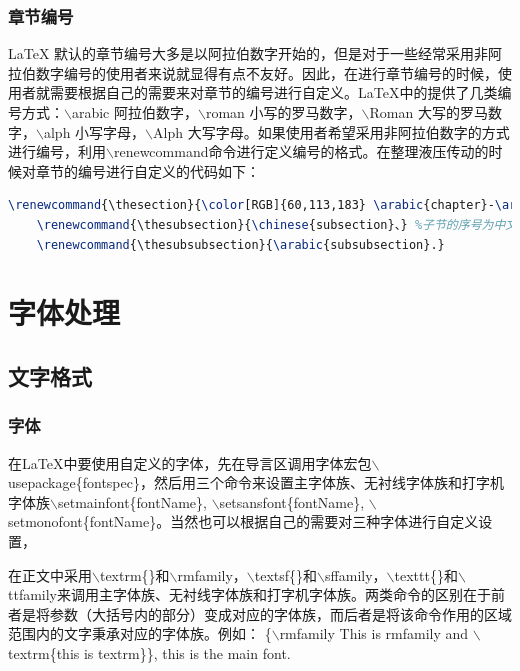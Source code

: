 \documentclass[12pt]{book}
\begin{document}
\subsection{章节编号}

\LaTeX{} 默认的章节编号大多是以阿拉伯数字开始的，但是对于一些经常采用非阿拉伯数字编号的使用者来说就显得有点不友好。因此，在进行章节编号的时候，使用者就需要根据自己的需要来对章节的编号进行自定义。\LaTeX{}中的提供了几类编号方式：$\backslash$arabic 阿拉伯数字，$\backslash$roman 小写的罗马数字，$\backslash$Roman 大写的罗马数字，$\backslash$alph 小写字母，$\backslash$Alph 大写字母。如果使用者希望采用非阿拉伯数字的方式进行编号，利用$\backslash$renewcommand命令进行定义编号的格式。在整理液压传动的时候对章节的编号进行自定义的代码如下：

\begin{lstlisting}[language=tex,breaklines]
    \renewcommand{\thesection}{\color[RGB]{60,113,183} \arabic{chapter}-\arabic{section}} %设置section的格式为章序号-节序号
    \renewcommand{\thesubsection}{\chinese{subsection}、} %子节的序号为中文序号+顿号
    \renewcommand{\thesubsubsection}{\arabic{subsubsection}.} 
\end{lstlisting}

\chapter{字体处理}



\section{文字格式}

\subsection{字体}

在\LaTeX{}中要使用自定义的字体，先在导言区调用字体宏包$\backslash$usepackage\{fontspec\}，然后用三个命令来设置主字体族、无衬线字体族和打字机字体族$\backslash$setmainfont\{fontName\}, $\backslash$setsansfont\{fontName\}, $\backslash$setmonofont\{fontName\}。当然也可以根据自己的需要对三种字体进行自定义设置，


在正文中采用$\backslash$textrm\{\}和$\backslash$rmfamily，$\backslash$textsf\{\}和$\backslash$sffamily，$\backslash$texttt\{\}和$\backslash$ttfamily来调用主字体族、无衬线字体族和打字机字体族。两类命令的区别在于前者是将参数（大括号内的部分）变成对应的字体族，而后者是将该命令作用的区域范围内的文字秉承对应的字体族。例如：
\{$\backslash$rmfamily This is rmfamily and $\backslash$textrm\{this is textrm\}\}, this is the main font.
\end{document}
